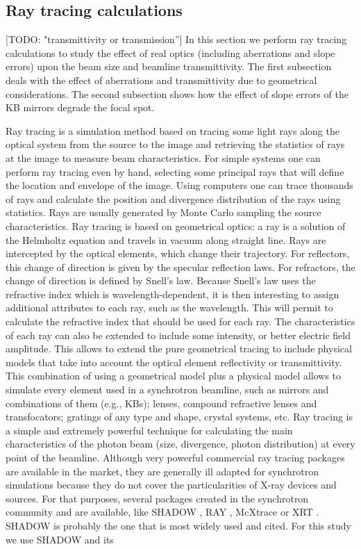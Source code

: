 \documentclass{iucr}              %
\newcommand{\todo}[1]{{\color{red}[TODO: "#1'']}}
\begin{document}
% 
\subsection{Ray tracing calculations}
\label{level1}
\todo{transmittivity or transmission}
In this section we perform ray tracing calculations to study the effect of real optics (including aberrations and slope errors) upon the beam size and beamline transmittivity. The first subsection deals with the effect of aberrations and transmittivity due to geometrical considerations. The second subsection shows how the effect of slope errors of the KB mirrors degrade the focal spot.  

Ray tracing is a simulation method based on tracing some light rays along the optical system from the source to the image and retrieving the statistics of rays at the image to measure beam characteristics. For simple systems one can perform ray tracing even by hand, selecting some principal rays that will define the location and envelope of the image. Using computers one can trace thousands of rays and calculate the position and divergence distribution of the rays using statistics. Rays are usually generated by Monte Carlo sampling the source characteristics. Ray tracing is based on geometrical optics: a ray is a solution of the Helmholtz equation and travels in vacuum along straight line. Rays are intercepted by the optical elements, which change their trajectory. For reflectors, this change of direction is given by the specular reflection laws. For refractors, the change of direction is defined by  Snell's law. Because Snell's law uses the refractive index which is wavelength-dependent, it is then interesting to assign additional attributes to each ray, such as the wavelength. This will permit to calculate the refractive index that should  be used for each ray. The characteristics of each ray can also be extended to include some intensity, or better electric field amplitude. This allows to extend the pure geometrical tracing to include physical models that take into account the optical element reflectivity or transmittivity. This combination of using a geometrical model plus a physical model allows to simulate every element used in a synchrotron beamline, such as mirrors and combinations of them (e.g., KBs); lenses, compound refractive lenses and transfocators; gratings of any type and shape, crystal systems, etc. Ray tracing is a simple and extremely powerful technique for calculating the main characteristics of the photon beam (size, divergence, photon distribution) at every point of the beamline. Although very powerful commercial ray tracing packages are available in the market, they are generally ill adapted for synchrotron simulations because they do not cover the particularities of X-ray devices and sources. For that purposes, several packages created in the synchrotron community and are available, like SHADOW \cite{codeSHADOW}, RAY \cite{codeRAY}, McXtrace \cite{codeMCXTRACE} or XRT \cite{codeXRT}. SHADOW is probably the one that is most widely used and cited. For this study we use SHADOW and its 
\end{document}
